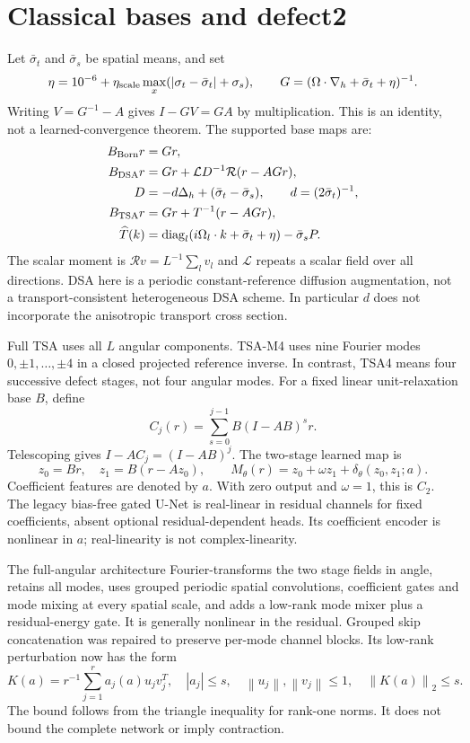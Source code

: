 \documentclass[11pt]{article}
\newcommand{\norm}[1]{\left\|#1\right\|}
\begin{document}
\section{Classical bases and defect2}
Let $\bar\sigma_t$ and $\bar\sigma_s$ be spatial means, and set
\[
 \eta=10^{-6}+\eta_{\rm scale}\max_x
       (|\sigma_t-\bar\sigma_t|+\sigma_s),\qquad
 G=(\Omega\cdot\nabla_h+\bar\sigma_t+\eta)^{-1}.
\]
Writing $V=G^{-1}-A$ gives $I-GV=GA$ by multiplication. This is an identity,
not a learned-convergence theorem. The supported base maps are:
\begin{align*}
 B_{\rm Born}r&=Gr,\\
 B_{\rm DSA}r&=Gr+\mathcal L D^{-1}\mathcal R(r-AGr),\\
 D&=-d\Delta_h+(\bar\sigma_t-\bar\sigma_s),\qquad d=(2\bar\sigma_t)^{-1},\\
 B_{\rm TSA}r&=Gr+T^{-1}(r-AGr),\\
 \widehat T(k)&=\operatorname{diag}_l(i\Omega_l\cdot k+\bar\sigma_t+\eta)
                      -\bar\sigma_s P.
\end{align*}
The scalar moment is $\mathcal Rv=L^{-1}\sum_l v_l$ and $\mathcal L$ repeats
a scalar field over all directions. DSA here is a periodic constant-reference
diffusion augmentation, not a transport-consistent heterogeneous DSA scheme.
In particular $d$ does not incorporate the anisotropic transport cross section.

Full TSA uses all $L$ angular components. TSA-M4 uses nine Fourier modes
$0,\pm1,\ldots,\pm4$ in a closed projected reference inverse. In contrast,
TSA4 means four successive defect stages, not four angular modes. For a fixed
linear unit-relaxation base $B$, define
\[
 C_j(r)=\sum_{s=0}^{j-1}B(I-AB)^s r.
\]
Telescoping gives $I-AC_j=(I-AB)^j$. The two-stage learned map is
\begin{equation}\label{eq:defect}
 z_0=Br,\quad z_1=B(r-Az_0),\qquad
 M_\theta(r)=z_0+\omega z_1+\delta_\theta(z_0,z_1;a).
\end{equation}
Coefficient features are denoted by $a$. With zero output and $\omega=1$, this
is $C_2$. The legacy bias-free gated U-Net is real-linear in residual channels
for fixed coefficients, absent optional residual-dependent heads. Its
coefficient encoder is nonlinear in $a$; real-linearity is not complex-linearity.

The full-angular architecture Fourier-transforms the two stage fields in angle,
retains all modes, uses grouped periodic spatial convolutions, coefficient gates
and mode mixing at every spatial scale, and adds a low-rank mode mixer plus a
residual-energy gate. It is generally nonlinear in the residual. Grouped skip
concatenation was repaired to preserve per-mode channel blocks. Its low-rank
perturbation now has the form
\[
 K(a)=r^{-1}\sum_{j=1}^r a_j(a)u_jv_j^T,
 \quad |a_j|\leq s,\quad \norm{u_j},\norm{v_j}\leq1,
 \quad\norm{K(a)}_2\leq s.
\]
The bound follows from the triangle inequality for rank-one norms. It does not
bound the complete network or imply contraction.
\end{document}
